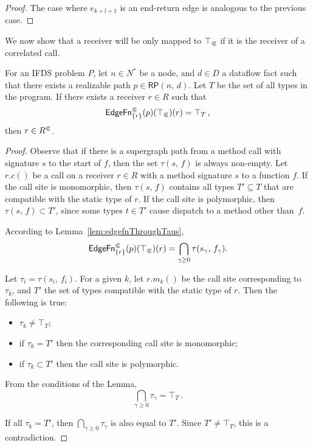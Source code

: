 \begin{proof}
The case where $e_{k+l+1}$ is an end-return edge is analogous to the previous case.
\end{proof}

We now show that a receiver will be only mapped to $\top_\Subset$ if it is the receiver of a correlated call.

\begin{lemma}\label{lem:ccrectop}
   For an IFDS problem $P$, let $n\in N^*$ be a node, and $d\in D$ a dataflow fact such that there exists a realizable path $p\in\textsf{RP}(n,\,d)$. Let $T$ be the set of all types in the program.
   If there exists a receiver $r\in R$ such that
  \[
    \textsf{EdgeFn}^\Subset_{\{r\}}(p)(\top_\Subset)(r)=\top_T\,,                       
  \]
  then $r\in {R^\Subset}$.
\end{lemma}
\begin{proof} 
Observe that if there is a supergraph path from a method call with signature $s$ to the start of $f$, then the set $\tau(s,\,f)$ is always non-empty.
  Let $r.c()$ be a call on a receiver $r\in R$ with a method signature $s$ to a function $f$.
  If the call site is monomorphic, then $\tau(s,\,f)$ contains all types $T'\subseteq T$ that are compatible with the static type of $r$.
  If the call site is polymorphic, then $\tau(s,\,f)\subset T'$, since some types $t\in T'$ cause dispatch to a method other than~$f$.
 
 According to Lemma~\ref{lem:edgefnThroughTaus},
 \[
   \textsf{EdgeFn}^\Subset_{\{r\}}(p)(\top_\Subset)(r)=
      \bigcap_{\gamma\ge0}\tau(s_\gamma,\,f_\gamma).
 \]
 
Let $\tau_i=\tau(s_i,\,f_i)$. 
 For a given $k$, let $r.m_k()$ be the call site corresponding to $\tau_k$, and $T'$ the set of types compatible with the static type of $r$. Then the following is true:
 \begin{itemize}
   \item $\tau_k\ne\top_T$;
   \item if $\tau_k=T'$ then the corresponding call site is monomorphic;
   \item if $\tau_k\subset T'$ then the call site is polymorphic.
 \end{itemize}  
 
 From the conditions of the Lemma, 
 \begin{equation}
   \bigcap_{\gamma\ge 0}\tau_\gamma=\top_T\,.
 \end{equation} 
 
 If all $\tau_k=T'$, then $\bigcap_{\gamma\ge 0}\tau_\gamma$ is also equal to $T'$. Since $T'\ne\top_T$, this is a contradiction. 
 

\end{proof}
